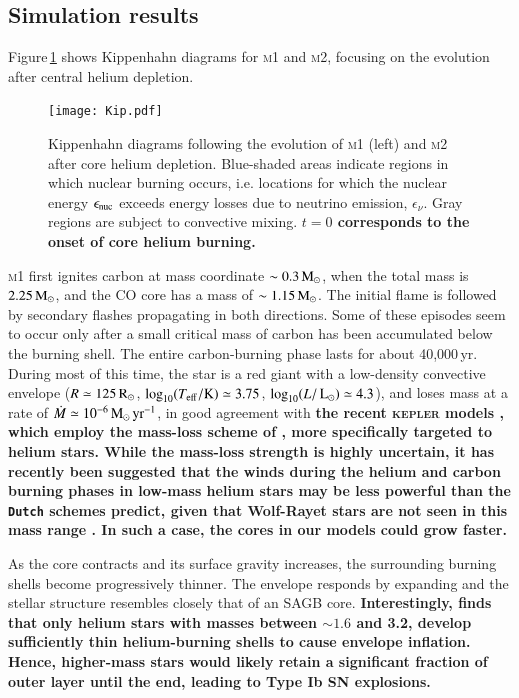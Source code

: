 \documentclass[twocolumn]{aa}
\begin{document}
\subsection{Simulation results}
Figure\,\ref{fig:1} shows Kippenhahn diagrams for 
 \textsc{m1} and \textsc{m2}, focusing on the evolution after central helium depletion.
\begin{figure}[htb!]
  \centering 
  \texttt{[image: Kip.pdf]}
  \caption{Kippenhahn diagrams following the evolution of \textsc{m1} (left) and \textsc{m2} after core helium depletion. Blue-shaded areas indicate regions in which nuclear burning occurs, i.e. locations for which the nuclear energy $\epsilon_{\rm nuc}$ exceeds energy losses due to neutrino emission, $\epsilon_\nu$. Gray regions are subject to convective mixing. {\bf $t=0$ corresponds to the onset of core helium burning.}}
  \label{fig:1}
\end{figure}
\textsc{m1} first ignites carbon at mass coordinate $\sim 0.3\mathrm{\,M_\odot}$, when the total mass  is $ 2.25\mathrm{\,M_\odot}$, and the CO core has a mass of $\sim 1.15\mathrm{\,M_\odot}$.  
The initial flame is followed by secondary flashes propagating in both 
directions. Some of these episodes seem to occur only after a small critical 
mass of carbon has been accumulated below the burning shell. The entire carbon-burning phase lasts for about 
40,000\,yr. During most of this time, the star is a red giant with a low-density convective envelope  
($R\simeq 125\mathrm{\,R_\odot}$, $\log_{10} (T_{\mathrm{eff}} /\mathrm{K})\simeq 3.75$, $\log_{10} (L/\mathrm{\,L_\odot})\simeq 
4.3$), and loses mass at a rate of  
$\dot{M}\simeq10^{-6}\mathrm{\,M_{\odot}\,yr^{-1}}$, in good agreement with {\bf the
recent \textsc{kepler} models \citep{Woosley:2019sdf}, which employ the mass-loss scheme of \cite{Yoon:2017dme}, more specifically targeted to helium stars. While the mass-loss strength is highly uncertain, it has recently been suggested that the winds during the helium and carbon burning phases in low-mass helium stars may be less powerful than the \texttt{Dutch} schemes predict, given that Wolf-Rayet stars are not seen in this mass range \citep{Vink:2017ujd}. In such a case, the cores in our models could grow faster.}

As the core contracts and its surface gravity increases, the surrounding burning shells become progressively thinner. The envelope responds by expanding  and the stellar structure resembles closely that of an SAGB core. {\bf Interestingly, \cite{Woosley:2019sdf} finds that only helium stars with masses between $\sim 1.6$ and 3.2\msun, develop sufficiently thin helium-burning shells to cause envelope inflation. Hence, higher-mass stars would likely retain a significant fraction of outer layer until the end, leading to Type Ib SN explosions.}
\end{document}
